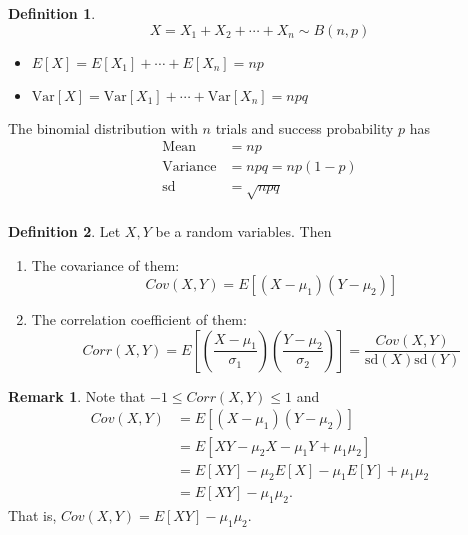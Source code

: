 \documentclass[12pt,openany]{book}
\theoremstyle{definition}
\newtheorem{definition}{Definition}[chapter]
\newtheorem{remark}{Remark}[chapter]
\newcommand{\dispsty}{\displaystyle}
\newcommand{\Var}{\text{Var}}
\newcommand{\sd}{\text{sd}}
\newcommand{\Cov}{\textit{Cov}}
\newcommand{\Corr}{\textit{Corr}}
\begin{document}
	\begin{tcolorbox}[colback=white,colframe=defcolor,arc=5pt,title={\color{white}\bf Mean and Standard Deviation of the Binomial Distribution}]
		\begin{definition}
			\[
			X=X_1+X_2+\cdots+X_n\sim B(n,p)
			\] \begin{itemize}
				\item \(E[X]=E[X_1] + \cdots + E[X_n] = np \)
				\item \(\Var[X]=\Var[X_1] + \cdots + \Var[X_n] = npq \)
			\end{itemize} The binomial distribution with $n$ trials and success probability $p$ has \begin{align*}
			\text{Mean} &= np \\
			\text{Variance} &= npq = np(1-p) \\
			\text{sd} &= \sqrt{npq} \\
		\end{align*}
		\end{definition}
	\end{tcolorbox}
	\vspace{10pt}
	\begin{tcolorbox}[colback=white,colframe=defcolor,arc=5pt,title={\color{white}\bf Covariance and Correlation Coefficient of Two Random Variables}]
		\begin{definition}
			Let $X, Y$ be a random variables. Then \begin{enumerate}
				\item The covariance of them: \[\Cov(X,Y)=E[(X-\mu_1)(Y-\mu_2)] \]
				\item The correlation coefficient of them: \[\dispsty\Corr(X,Y)=E\left[\left(\frac{X-\mu_1}{\sigma_1}\right)\left(\frac{Y-\mu_2}{\sigma_2}\right)\right]=\frac{\Cov(X,Y)}{\sd(X)\sd(Y)} \]
			\end{enumerate}
		\end{definition}
	\end{tcolorbox}
	\begin{remark}
		Note that $-1\leq\Corr(X,Y)\leq 1$ and \begin{align*}
			\Cov(X,Y) &= E[(X-\mu_1)(Y-\mu_2) ] \\
			&= E[XY-\mu_2X-\mu_1Y+\mu_1\mu_2] \\
			&= E[XY] - \mu_2E[X] -\mu_1E[Y] +\mu_1\mu_2 \\
			&= E[XY] - \mu_1\mu_2.
		\end{align*} That is, $\Cov(X,Y)=E[XY]-\mu_1\mu_2$.
	\end{remark}
\end{document}

